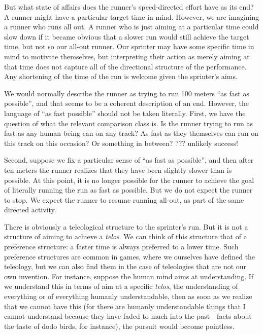 But what state of affairs does the runner's speed-directed effort have as its end? A runner might have a particular target time in mind.
However, we are imagining a runner who runs all out. A runner who is just aiming at a particular time could slow down if it became obvious
that a slower run would still achieve the target time, but not so our all-out runner. Our sprinter may have some specific time in mind
to motivate themselves, but interpreting their action as merely aiming at that time does not capture all of the directional structure 
of the performance. Any shortening of the time of the run is welcome given the sprinter's aims. 

We would normally describe the runner as trying to run 100 meters ``as fast as possible'', and that seems to be a coherent description
of an end. However, the language of ``as fast possible'' should not be taken literally. First, we have the question of what the relevant
comparison class is. Is the runner trying to run as fast as any human being can on any track? As fast as they themselves can run on this
track on this occasion? Or something in between? ??? unlikely success!

Second, suppose we fix a particular sense of ``as fast as possible'', and then after ten meters the runner realizes that they have
been slightly slower than is possible. At this point, it is no longer possible for the runner to achieve the goal of literally running
the run as fast as possible. But we do not expect the runner to stop. We expect the runner to resume running all-out, as part of the
same directed activity.

There is obviously a teleological structure to the sprinter's run. But it is not a structure of aiming to achieve a \textit{telos}. 
We can think of this structure that of a preference structure: a faster time is always preferred to a lower time. 
Such preference structures are common in games, where we ourselves have defined the teleology, but we can also find them in the 
case of teleologies that are not our own invention. For instance, suppose the human mind aims at understanding. If we understand
this in terms of aim at a specific \textit{telos}, the understanding of everything or of everything humanly understandable, then as soon as 
we realize that we cannot have this (for there are humanly understandable things that I cannot understand because they have faded to much
into the past---facts about the taste of dodo birds, for instance), the pursuit would become pointless. 

